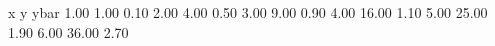 x	     y	   ybar
1.00 	1.00 	0.10 
2.00 	4.00 	0.50 
3.00 	9.00 	0.90 
4.00 	16.00 	1.10 
5.00 	25.00 	1.90 
6.00 	36.00 	2.70 
